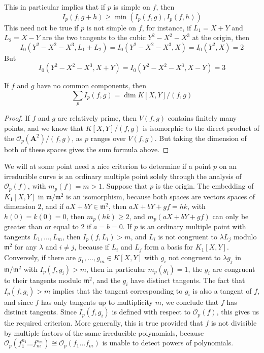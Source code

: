 This in particular implies that if $p$ is simple on $f$, then
%
\[ I_p(f,g + h) \geq \min(I_p(f,g), I_p(f,h)) \]
%
This need not be true if $p$ is not simple on $f$, for instance, if $L_1 = X + Y$ and $L_2 = X - Y$ are the two tangents to the cubic $Y^2 - X^2 - X^3$ at the origin, then
%
\[ I_0(Y^2 - X^2 - X^3, L_1 + L_2) = I_0(Y^2 - X^2 - X^3, X) = I_0(Y^2,X) = 2 \]
%
But
%
\[ I_0(Y^2 - X^2 - X^3, X + Y) = I_0(Y^2 - X^2 - X^3, X - Y) = 3 \]

\begin{theorem}
    If $f$ and $g$ have no common components, then
    \[ \sum_p I_p(f,g) = \dim K[X,Y]/(f,g) \]
\end{theorem}
\begin{proof}
    If $f$ and $g$ are relatively prime, then $V(f,g)$ contains finitely many points, and we know that $K[X,Y]/(f,g)$ is isomorphic to the direct product of the $\mathcal{O}_p(\mathbf{A}^2)/(f,g)$, as $p$ ranges over $V(f,g)$. But taking the dimension of both of these spaces gives the sum formula above.
\end{proof}

We will at some point need a nice criterion to determine if a point $p$ on an irreducible curve is an ordinary multiple point solely through the analysis of $\mathcal{O}_p(f)$, with $m_p(f) = m > 1$. Suppose that $p$ is the origin. The embedding of $K_1[X,Y]$ in $\mathfrak{m}/\mathfrak{m}^2$ is an isomorphism, because both spaces are vectors spaces of dimension $2$, and if $aX + bY \in \mathfrak{m}^2$, then $aX + bY + gf = hk$, with $h(0) = k(0) = 0$, then $m_p(hk) \geq 2$, and $m_p(aX + bY + gf)$ can only be greater than or equal to 2 if $a = b = 0$. If $p$ is an ordinary multiple point with tangents $L_1, \dots, L_m$, then $I_p(f,L_i) > m$, and $L_i$ is not congruent to $\lambda L_j$ modulo $\mathfrak{m}^2$ for any $\lambda$ and $i \neq j$, because if $L_i$ and $L_j$ form a basis for $K_1[X,Y]$. Conversely, if there are $g_1, \dots, g_m \in K[X,Y]$ with $g_i$ not congruent to $\lambda g_j$ in $\mathfrak{m}/\mathfrak{m}^2$ with $I_p(f,g_i) > m$, then in particular $m_p(g_i) = 1$, the $g_i$ are congruent to their tangents modulo $\mathfrak{m}^2$, and the $g_i$ have distinct tangents. The fact that $I_p(f,g_i) > m$ implies that the tangent corresponding to $g_i$ is also a tangent of $f$, and since $f$ has only tangents up to multiplicity $m$, we conclude that $f$ has distinct tangents. Since $I_p(f,g_i)$ is defined with respect to $\mathcal{O}_p(f)$, this gives us the required criterion. More generally, this is true provided that $f$ is not divisible by multiple factors of the same irreducible polynomials, because $\mathcal{O}_p(f_1^{n_1} \dots f_m^{n_m}) \cong \mathcal{O}_p(f_1 \dots f_m)$ is unable to detect powers of polynomials.





